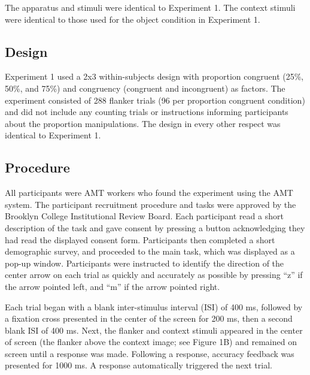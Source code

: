 \documentclass[english,,man,floatsintext]{apa6}
\begin{document}
The apparatus and stimuli were identical to Experiment 1. The context stimuli were identical to those used for the object condition in Experiment 1.

\hypertarget{design-2}{%
\subsection{Design}\label{design-2}}

Experiment 1 used a 2x3 within-subjects design with proportion congruent (25\%, 50\%, and 75\%) and congruency (congruent and incongruent) as factors. The experiment consisted of 288 flanker trials (96 per proportion congruent condition) and did not include any counting trials or instructions informing participants about the proportion manipulations. The design in every other respect was identical to Experiment 1.

\hypertarget{procedure-2}{%
\subsection{Procedure}\label{procedure-2}}

All participants were AMT workers who found the experiment using the AMT system. The participant recruitment procedure and tasks were approved by the Brooklyn College Institutional Review Board. Each participant read a short description of the task and gave consent by pressing a button acknowledging they had read the displayed consent form. Participants then completed a short demographic survey, and proceeded to the main task, which was displayed as a pop-up window. Participants were instructed to identify the direction of the center arrow on each trial as quickly and accurately as possible by pressing \enquote{z} if the arrow pointed left, and \enquote{m} if the arrow pointed right.

Each trial began with a blank inter-stimulus interval (ISI) of 400 ms, followed by a fixation cross presented in the center of the screen for 200 ms, then a second blank ISI of 400 ms. Next, the flanker and context stimuli appeared in the center of screen (the flanker above the context image; see Figure 1B) and remained on screen until a response was made. Following a response, accuracy feedback was presented for 1000 ms. A response automatically triggered the next trial.
\end{document}
